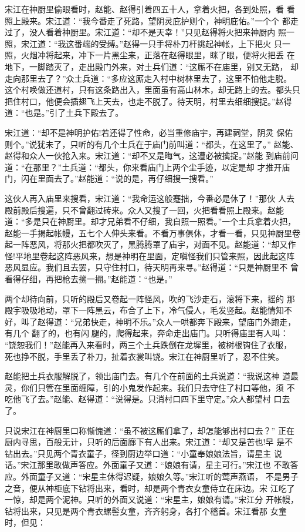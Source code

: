 宋江在神厨里偷眼看时，赵能、赵得引着四五十人，拿着火把，各到处照，看
看照上殿来。宋江道：“我今番走了死路，望阴灵庇护则个，神明庇佑。”一个个
都走过了，没人看着神厨里。宋江道：“却不是天幸！”只见赵得将火把来神厨内
照一照，宋江道：“我这番端的受缚。”赵得一只手将朴刀杆挑起神帐，上下把火
只一照，火烟冲将起来，冲下一片黑尘来，正落在赵得眼里，眯了眼，便将火把丢
在地下，一脚踏灭了，走出殿门外来，对土兵们道：“这厮不在庙里，别又无路，
却走向那里去了？”众土兵道：“多应这厮走入村中树林里去了，这里不怕他走脱。
这个村唤做还道村，只有这条路出入，里面虽有高山林木，却无路上的去。都头只
把住村口，他便会插翅飞上天去，也走不脱了。待天明，村里去细细搜捉。”赵得
道：“也是。”引了土兵下殿去了。

宋江道：“却不是神明护佑!若还得了性命，必当重修庙宇，再建祠堂，阴灵
保佑则个。”说犹未了，只听的有几个土兵在于庙门前叫道：“都头，在这里了。”
赵能、赵得和众人一伙抢入来。宋江道：“却不又是晦气，这遭必被擒捉。”赵能
到庙前问道：“在那里？”土兵道：“都头，你来看庙门上两个尘手迹，以定是却
才推开庙门，闪在里面去了。”赵能道：“说的是，再仔细搜一搜看。”

这伙人再入庙里来搜看，宋江道：“我命运这般蹇拙，今番必是休了！”那伙
人去殿前殿后搜遍，只不曾翻过砖来。众人又搜了一回，火把看看照上殿来。赵能
道：“多是只在神厨里。却才兄弟看不仔细，我自照一照看。”一个土兵拿着火把，
赵能一手揭起帐幔，五七个人伸头来看。不看万事俱休，才看一看，只见神厨里卷
起一阵恶风，将那火把都吹灭了，黑腾腾罩了庙宇，对面不见。赵能道：“却又作
怪!平地里卷起这阵恶风来，想是神明在里面，定嗔怪我们只管来照，因此起这阵
恶风显应。我们且去罢，只守住村口，待天明再来寻。”赵得道：“只是神厨里不
曾看得仔细，再把枪去搠一搠。”赵能道：“也是。”

两个却待向前，只听的殿后又卷起一阵怪风，吹的飞沙走石，滚将下来，摇的
那殿宇吸吸地动，罩下一阵黑云，布合了上下，冷气侵人，毛发竖起。赵能情知不
好，叫了赵得道：“兄弟快走，神明不乐。”众人一哄都奔下殿来，望庙门外跑走，
有几个翻了的，也有闪腿的，爬得起来，奔命走出庙门。只听得庙里有人叫：
“饶恕我们！”赵能再入来看时，两三个土兵跌倒在龙墀里，被树根钩住了衣服，
死也挣不脱，手里丢了朴刀，扯着衣裳叫饶。宋江在神厨里听了，忍不住笑。

赵能把土兵衣服解脱了，领出庙门去。有几个在前面的土兵说道：“我说这神
道最灵，你们只管在里面缠障，引的小鬼发作起来。我们只去守住了村口等他，须
不吃他飞了去。”赵能、赵得道：“说得是。只消村口四下里守定。”众人都望村
口去了。

只说宋江在神厨里口称惭愧道：“虽不被这厮们拿了，却怎能够出村口去？”
正在厨内寻思，百般无计，只听的后面廊下有人出来。宋江道：“却又是苦也!早
是不钻出去。”只见两个青衣童子，径到厨边举口道：“小童奉娘娘法旨，请星主
说话。”宋江那里敢做声答应。外面童子又道：“娘娘有请，星主可行。”宋江也
不敢答应。外面童子又道：“宋星主休得迟疑，娘娘久等。”宋江听的莺声燕语，
不是男子之音，便从神柜底下钻将出来，看时，却是两个青衣女童侍立在床边。宋
江吃了一惊，却是两个泥神。只听的外面又说道：“宋星主，娘娘有请。”宋江分
开帐幔，钻将出来，只见是两个青衣螺髻女童，齐齐躬身，各打个稽首。宋江看那
女童时，但见：

